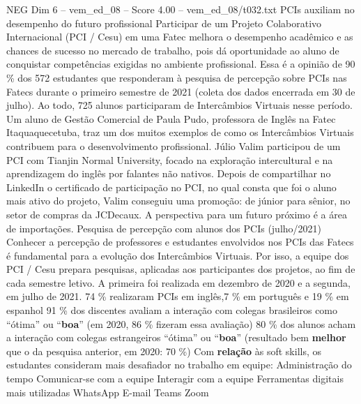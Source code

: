 \begin{textsample}{NEG Dim 6 – vem\_ed\_08 – Score 4.00 – vem\_ed\_08/t032.txt}  \label{ex:f6_neg_101}
PCIs auxiliam no desempenho do futuro profissional Participar de um Projeto Colaborativo Internacional (PCI / Cesu) em uma Fatec melhora o desempenho acadêmico e as chances de sucesso no mercado de trabalho, pois dá oportunidade ao aluno de conquistar competências exigidas no ambiente profissional.
Essa é a opinião de 90 \% dos 572 estudantes que responderam à pesquisa de percepção sobre PCIs nas Fatecs durante o primeiro semestre de 2021 (coleta dos dados encerrada em 30 de julho).
Ao todo, 725 alunos participaram de Intercâmbios Virtuais nesse período.
Um aluno de Gestão Comercial de Paula Pudo, professora de Inglês na Fatec Itaquaquecetuba, traz um dos muitos exemplos de como os Intercâmbios Virtuais contribuem para o desenvolvimento profissional.
Júlio Valim participou de um PCI com Tianjin Normal University, focado na exploração intercultural e na aprendizagem do inglês por falantes não nativos.
Depois de compartilhar no LinkedIn o certificado de participação no PCI, no qual consta que foi o aluno mais ativo do projeto, Valim conseguiu uma promoção: de júnior para sênior, no setor de compras da JCDecaux.
A perspectiva para um futuro próximo é a área de importações.
Pesquisa de percepção com alunos dos PCIs (julho/2021) Conhecer a percepção de professores e estudantes envolvidos nos PCIs das Fatecs é fundamental para a evolução dos Intercâmbios Virtuais.
Por isso, a equipe dos PCI / Cesu prepara pesquisas, aplicadas aos participantes dos projetos, ao fim de cada semestre letivo.
A primeira foi realizada em dezembro de 2020 e a segunda, em julho de 2021. 74 \% realizaram PCIs em inglês,7 \% em português e 19 \% em espanhol 91 \% dos discentes avaliam a interação com colegas brasileiros como “ótima” ou “\textbf{boa}” (em 2020, 86 \% fizeram essa avaliação) 80 \% dos alunos acham a interação com colegas estrangeiros “ótima” ou “\textbf{boa}” (resultado bem \textbf{melhor} que o da pesquisa anterior, em 2020: 70 \%) Com \textbf{relação} às soft skills, os estudantes consideram mais desafiador no trabalho em equipe: Administração do tempo Comunicar-se com a equipe Interagir com a equipe Ferramentas digitais mais utilizadas WhatsApp E-mail Teams Zoom

\end{textsample}
